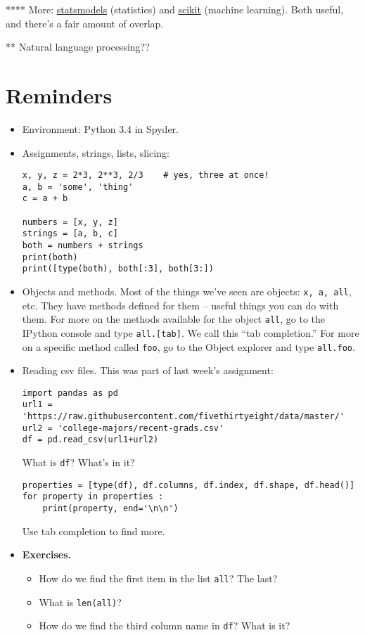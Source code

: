 \documentclass[11pt]{article}
\begin{document}
**** More:  
\href{http://statsmodels.sourceforge.net/}{statsmodels} (statistics)
and 
\href{http://scikit-learn.org/stable/}{scikit} (machine learning).
Both useful, and there's a fair amount of overlap.  

** Natural language processing??  


\section{Reminders}

\begin{itemize}
\item Environment:  Python 3.4 in Spyder.
\item Assignments, strings, lists, slicing:
\begin{verbatim}
x, y, z = 2*3, 2**3, 2/3    # yes, three at once!
a, b = 'some', 'thing'
c = a + b

numbers = [x, y, z]
strings = [a, b, c]
both = numbers + strings
print(both)
print([type(both), both[:3], both[3:])
\end{verbatim}

\item Objects and methods.  Most of the things we've seen are objects:  {\tt x, a, all}, etc.
They have methods defined for them -- useful things you can do with them.
For more on the methods available for the object {\tt all},
go to the IPython console and type {\tt all.[tab]}.
We call this ``tab completion.''
For more on a specific method called {\tt foo},
go to the Object explorer and type {\tt all.foo}.

\item Reading csv files.
This was part of last week's assignment:
\begin{verbatim}
import pandas as pd
url1 = 'https://raw.githubusercontent.com/fivethirtyeight/data/master/'
url2 = 'college-majors/recent-grads.csv'
df = pd.read_csv(url1+url2)
\end{verbatim}
What is {\tt df}?  What's in it?
\begin{verbatim}
properties = [type(df), df.columns, df.index, df.shape, df.head()]
for property in properties :
    print(property, end='\n\n')
\end{verbatim}
Use tab completion to find more.


\item {\bf Exercises.}
\begin{itemize}
\item How do we find the first item in the list {\tt all}?  The last?
\item What is {\tt len(all)}?
\item How do we find the third column name in {\tt df}?  What is it?
\end{itemize}

\end{itemize}
\end{document}
